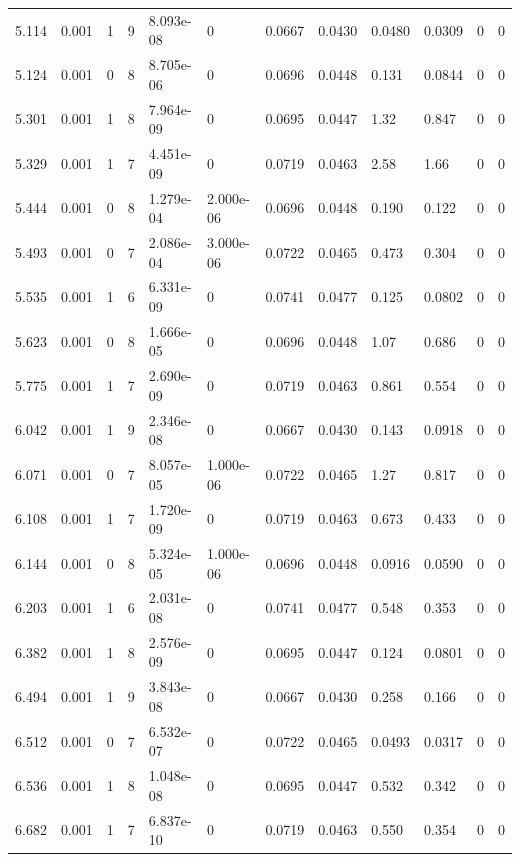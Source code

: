 \documentclass[preview]{standalone}
\begin{document}
{{{\begin{tabular}{L{1.2cm}C{1.2cm} C{0.3cm}C{0.5cm} C{1.4cm}C{1.4cm} C{1.4cm}C{1.4cm} C{1.6cm}C{1.6cm} C{1.6cm}C{1.6cm}}
  5.114  &  0.001  & 1     &  9 &  8.093e-08  & 0  &  0.0667&   0.0430& 0.0480 & 0.0309   &  0 & 0  \\ 
  5.124  &  0.001  & 0     &  8 &  8.705e-06  & 0  &  0.0696&   0.0448& 0.131 & 0.0844   &  0 & 0  \\ 
  5.301  &  0.001  & 1     &  8 &  7.964e-09  & 0  &  0.0695&   0.0447& 1.32 & 0.847   &  0 & 0  \\ 
  5.329  &  0.001  & 1     &  7 &  4.451e-09  & 0  &  0.0719&   0.0463& 2.58 & 1.66   &  0 & 0  \\ 
  5.444  &  0.001  & 0     &  8 &  1.279e-04  & 2.000e-06  &  0.0696&   0.0448& 0.190 & 0.122   &  0 & 0  \\ 
  5.493  &  0.001  & 0     &  7 &  2.086e-04  & 3.000e-06  &  0.0722&   0.0465& 0.473 & 0.304   &  0 & 0  \\ 
  5.535  &  0.001  & 1     &  6 &  6.331e-09  & 0  &  0.0741&   0.0477& 0.125 & 0.0802   &  0 & 0  \\ 
  5.623  &  0.001  & 0     &  8 &  1.666e-05  & 0  &  0.0696&   0.0448& 1.07 & 0.686   &  0 & 0  \\ 
  5.775  &  0.001  & 1     &  7 &  2.690e-09  & 0  &  0.0719&   0.0463& 0.861 & 0.554   &  0 & 0  \\ 
  6.042  &  0.001  & 1     &  9 &  2.346e-08  & 0  &  0.0667&   0.0430& 0.143 & 0.0918   &  0 & 0  \\ 
  6.071  &  0.001  & 0     &  7 &  8.057e-05  & 1.000e-06  &  0.0722&   0.0465& 1.27 & 0.817   &  0 & 0  \\ 
  6.108  &  0.001  & 1     &  7 &  1.720e-09  & 0  &  0.0719&   0.0463& 0.673 & 0.433   &  0 & 0  \\ 
  6.144  &  0.001  & 0     &  8 &  5.324e-05  & 1.000e-06  &  0.0696&   0.0448& 0.0916 & 0.0590   &  0 & 0  \\ 
  6.203  &  0.001  & 1     &  6 &  2.031e-08  & 0  &  0.0741&   0.0477& 0.548 & 0.353   &  0 & 0  \\ 
  6.382  &  0.001  & 1     &  8 &  2.576e-09  & 0  &  0.0695&   0.0447& 0.124 & 0.0801   &  0 & 0  \\ 
  6.494  &  0.001  & 1     &  9 &  3.843e-08  & 0  &  0.0667&   0.0430& 0.258 & 0.166   &  0 & 0  \\ 
  6.512  &  0.001  & 0     &  7 &  6.532e-07  & 0  &  0.0722&   0.0465& 0.0493 & 0.0317   &  0 & 0  \\ 
  6.536  &  0.001  & 1     &  8 &  1.048e-08  & 0  &  0.0695&   0.0447& 0.532 & 0.342   &  0 & 0  \\ 
  6.682  &  0.001  & 1     &  7 &  6.837e-10  & 0  &  0.0719&   0.0463& 0.550 & 0.354   &  0 & 0  \\ 

\end{tabular}}}}
\end{document}

